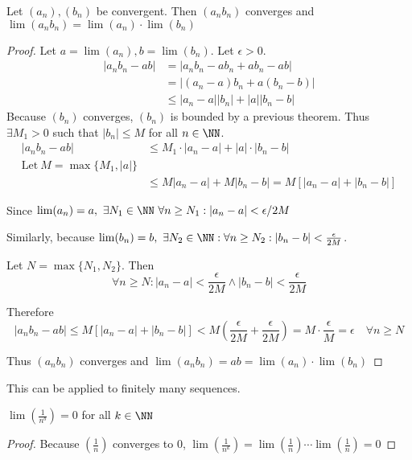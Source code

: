 \documentclass[class=scrartcl, crop=false]{standalone}
\begin{document}
\begin{theorem}
  Let $(a_n), (b_n)$ be convergent. Then $(a_nb_n)$ converges and $\lim(a_nb_n) = \lim(a_n)\cdot\lim(b_n)$
  \begin{proof}
    Let  $a = \lim(a_n), b = \lim(b_n).$ Let $\epsilon > 0$.
    \begin{align*}
      |a_nb_n - ab| &= |a_nb_n - ab_n + ab_n - ab| \\
                    &= |(a_n - a)b_n + a(b_n - b)| \\
                    &\leq |a_n - a||b_n| + |a||b_n - b|
    \end{align*}
    Because $(b_n)$ converges, $(b_n)$ is bounded by a previous theorem. Thus $\exists M_1 > 0$ such that $|b_n| \leq M$ for all $n \in \NN$.
    \begin{align*}
      |a_nb_n - ab| &\leq M_1\cdot|a_n - a| + |a|\cdot|b_n - b| \\
      \text{Let} \ M = \max\{M_1, |a|\} \\
      &\leq M|a_n - a| + M|b_n - b| = M\left[|a_n - a| + |b_n - b|\right]
    \end{align*}

    Since  $\lim(a_n) = a, \ \exists N_1 \in \NN \ \forall n \geq N_1: |a_n - a| < \epsilon / 2M$ \newline

    Similarly, because $\lim(b_n) = b,\ \exists N_2 \in \NN: \forall n \geq N_2:|b_n - b| < \frac{\epsilon}{2M}$.\newline

    Let $N = \max\{N_1, N_2\}$. Then
    \[
      \forall n \geq N: |a_n - a| < \frac{\epsilon}{2M} \wedge |b_n - b| < \frac{\epsilon}{2M}
    \] \newline

    Therefore
    \[|a_nb_n - ab| \leq M\left[|a_n - a| + |b_n - b|\right] < M ( \frac{\epsilon}{2M} + \frac{\epsilon}{2M}) = M \cdot \frac{\epsilon}{M} = \epsilon \quad \forall n \geq N\] \newline

    Thus $(a_nb_n)$ converges and $\lim(a_nb_n) = ab = \lim(a_n)\cdot\lim(b_n)$
  \end{proof}

  This can be applied to finitely many sequences.
\end{theorem}

\begin{example}
  $\lim(\frac{1}{n^b}) = 0$ for all $k \in \NN$
  \begin{proof}
    Because $(\frac{1}{n})$ converges to 0, $\lim(\frac{1}{n^k}) = \lim(\frac{1}{n})\cdots\lim(\frac{1}{n}) = 0$
  \end{proof}
\end{example}
\end{document}
